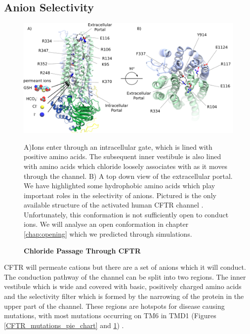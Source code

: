 \subsection {Anion Selectivity}

\begin{figure}
	\begin{center}
	\includegraphics[width=\textwidth]{figures/chloride_passage_figure.pdf}
	\end{center}
	\captionsetup{singlelinecheck = false, justification=raggedright}
	\caption[Chloride Passage through CFTR] {\textbf{Chloride Passage Through CFTR}}{A)Ions enter through an intracellular gate, which is lined with positive amino acids. The subsequent inner vestibule is also lined with amino acids which chloride loosely associates with as it moves through the channel. B) A top down view of the extracellular portal. We have highlighted some hydrophobic amino acids which play important roles in the selectivity of anions. Pictured is the only available structure of the activated human CFTR channel \cite{zhang2018}. Unfortunately, this conformation is not sufficiently open to conduct ions. We will analyse an open conformation in chapter \ref{chap:opening} which we predicted through simulations.} 
	\label{chloride_passage}

\end{figure}

CFTR will permeate cations but there are a set of anions which it will conduct. The conduction pathway of the channel can be split into two regions. The inner vestibule which is wide and covered with basic, positively charged amino acids and the selectivity filter which is formed by the narrowing of the protein in the upper part of the channel. These regions are hotspots for disease causing  mutations, with most mutations occurring on TM6 in TMD1 (Figures \ref{CFTR_mutations_pie_chart} and \ref{chloride_passage}) \cite{cftr2}.

